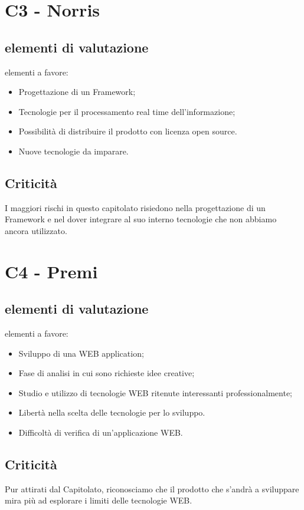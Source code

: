 \section{C3 - Norris}{
	\subsection{elementi di valutazione}{
		elementi a favore:
		\begin{itemize}
			\item Progettazione di un Framework;
			\item Tecnologie per il processamento real time dell'informazione;
			\item Possibilità di distribuire il prodotto con licenza open source.
		\end{itemize}
		
		\begin{itemize}
			\item Nuove tecnologie da imparare.
		\end{itemize}
	}
	\subsection{Criticità}{
		I maggiori rischi in questo capitolato risiedono nella progettazione di un Framework e nel dover integrare al suo interno tecnologie che non abbiamo ancora utilizzato.
	}
}
\section{C4 - Premi}{
	\subsection{elementi di valutazione}{
		elementi a favore:
		\begin{itemize}
			\item Sviluppo di una WEB application;
			\item Fase di analisi in cui sono richieste idee creative;
			\item Studio e utilizzo di tecnologie WEB ritenute interessanti professionalmente;
			\item Libertà nella scelta delle tecnologie per lo sviluppo.
		\end{itemize}
		
		\begin{itemize}
			\item Difficoltà di verifica di un'applicazione WEB.
		\end{itemize}
	}
	\subsection{Criticità}{
		Pur attirati dal Capitolato, riconosciamo che il prodotto che s'andrà a sviluppare mira più ad esplorare i limiti delle tecnologie WEB.
	}
}
